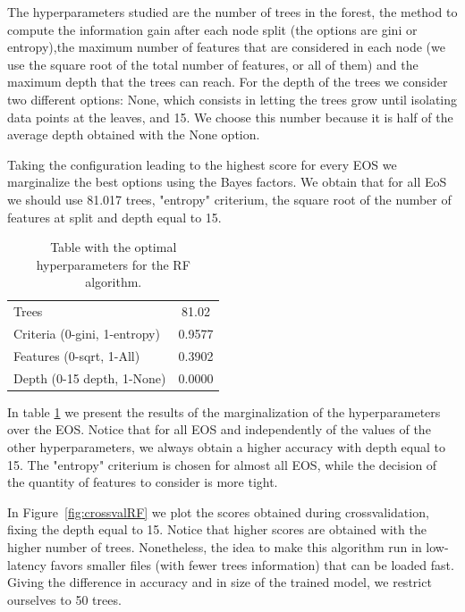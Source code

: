The hyperparameters studied are the number of trees in the forest, the method to compute the information gain after each node split (the options are gini or entropy),the maximum number of features that are considered in each node (we use the square root of the total number of features, or all of them) and the maximum depth that the trees can reach. For the depth of the trees we consider two different options: None, which consists in letting the trees grow until isolating data points at the leaves, and 15. We choose this number because it is half of the average depth obtained with the None option.

Taking the configuration leading to the highest score for every EOS we marginalize the best options using the Bayes factors. We obtain that for all EoS we should use 81.017 trees, "entropy" criterium, the square root of the number of features at split and depth equal to 15.

\begin{table}[h]
\begin{tabular}{|l|c|}
\hline
Trees& 81.02 \\
Criteria (0-gini, 1-entropy)& 0.9577 \\
Features (0-sqrt, 1-All)& 0.3902  \\
Depth (0-15 depth, 1-None)& 0.0000 \\ \hline
\end{tabular}
\caption{Table with the optimal hyperparameters for the RF algorithm. \label{tab:RF_cross_params}}
\end{table}

In table \ref{tab:RF_cross_params} we present the results of the marginalization of the hyperparameters over the EOS. Notice that for all EOS and independently of the values of the other hyperparameters, we always obtain a higher accuracy with depth equal to 15. The "entropy" criterium is chosen for almost all EOS, while the decision of the quantity of features to consider is more tight.

In Figure~\ref{fig:crossvalRF} we plot the scores obtained during crossvalidation, fixing the depth equal to 15. Notice that higher scores are obtained with the higher number of trees. Nonetheless, the idea to make this algorithm run in low-latency favors smaller files (with fewer trees information) that can be loaded fast. Giving the difference in accuracy and in size of the trained model, we restrict ourselves to 50 trees.

